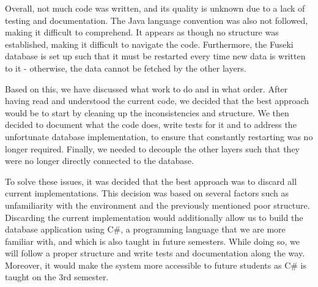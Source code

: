 Overall, not much code was written, and its quality is unknown due to a lack of testing and documentation.
The Java language convention was also not followed\cite{java_convention}, making it difficult to comprehend.
It appears as though no structure was established, making it difficult to navigate the code. 
Furthermore, the Fuseki database is set up such that it must be restarted every time new data is written to it - otherwise, the data cannot be fetched by the other layers\cite{knox2020}.

Based on this, we have discussed what work to do and in what order.
After having read and understood the current code, we decided that the best approach would be to start by cleaning up the inconsistencies and structure.
We then decided to document what the code does, write tests for it and to address the unfortunate database implementation, to ensure that constantly restarting was no longer required.
Finally, we needed to decouple the other layers such that they were no longer directly connected to the database.

To solve these issues, it was decided that the best approach was to discard all current implementations. 
This decision was based on several factors such as unfamiliarity with the environment and the previously mentioned poor structure. 
Discarding the current implementation would additionally allow us to build the database application using C\#, a programming language that we are more familiar with, and which is also taught in future semesters. 
While doing so, we will follow a proper structure and write tests and documentation along the way. 
Moreover, it would make the system more accessible to future students as C\# is taught on the 3rd semester.
